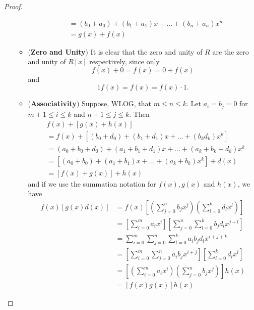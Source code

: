 \begin{proof}
\begin{enumerate}
\begin{itemize}
\begin{align*}
                        &= (b_0 + a_0) + (b_1 + a_1) x + \hdots + (b_n + a_n) x^n \\
                        &= g(x) + f(x)
          \end{align*}
        \item (\textbf{Zero and Unity}) It is clear that the zero and unity of $R$ are the zero and unity of $R[x]$ respectively, since only
          \begin{equation*}
            f(x) + 0 = f(x) = 0 + f(x)
          \end{equation*}
          and
          \begin{equation*}
            1 f(x) = f(x) = f(x) \cdot 1.
          \end{equation*}
        \item (\textbf{Associativity}) Suppose, WLOG, that $m \leq n \leq k$. Let $a_i = b_j = 0$ for $m + 1 \leq i \leq k$ and $n + 1 \leq j \leq k$. Then
          \begin{align*}
            &f(x) + [ g(x) + h(x) ]\\
            &= f(x) + [ (b_0 + d_0) + (b_1 + d_1) x + \hdots + (b_k d_k) x^k ] \\
            &= (a_0 + b_0 + d_0) + (a_1 + b_1 + d_1) x + \hdots + (a_k + b_k + d_k) x^k \\
            &= [(a_0 + b_0) + (a_1 + b_1) x + \hdots + (a_k + b_k) x^k] + d(x) \\
            &= [ f(x) + g(x) ] + h(x)
          \end{align*}
          and if we use the summation notation for $f(x), g(x)$ and $h(x)$, we have
          \begin{align*}
            f(x) [ g(x) d(x) ] &= f(x) \left[ \left( \sum_{j=0}^{n} b_j x^j \right)\left( \sum_{l=0}^{k} d_l x^l \right) \right] \\
                               &= \left[ \sum_{i=0}^{m} a_i x^i \right] \left[ \sum_{j=0}^{n} \sum_{l=0}^{k} b_j d_l x^{j + l} \right] \\
                               &= \sum_{i=0}^{m} \sum_{j=0}^{n} \sum_{l=0}^{k} a_i b_j d_l x^{i + j + k} \\
                               &= \left[ \sum_{i=0}^{m} \sum_{j=0}^{n} a_i b_j x^{i + j} \right] \left[ \sum_{l=0}^{k} d_l x^l \right] \\
                               &= \left[ \left( \sum_{i=0}^{m} a_i x^i \right) \left( \sum_{j=0}^{n} b_j x^j \right) \right] h(x) \\
                               &= [ f(x) g(x) ] h(x)

\end{align*}
\end{itemize}
\end{enumerate}
\end{proof}
